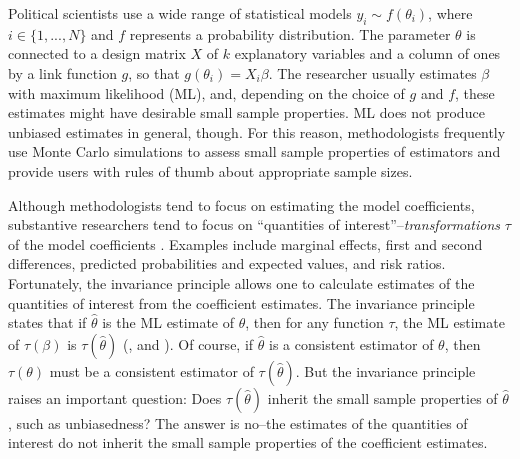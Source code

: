 \documentclass[12pt]{article}
\begin{document}
Political scientists use a wide range of statistical models $y_i \sim f(\theta_i)$, where $i \in \{1,..., N\}$ and $f$ represents a probability distribution. 
The parameter $\theta$ is connected to a design matrix $X$ of $k$ explanatory variables and a column of ones by a link function $g$, so that $g(\theta_i) = X_i\beta$. 
The researcher usually estimates $\beta$ with maximum likelihood (ML), and, depending on the choice of $g$ and $f$, these estimates might have desirable small sample properties. 
ML does not produce unbiased estimates in general, though. 
For this reason, methodologists frequently use Monte Carlo simulations to assess small sample properties of estimators and provide users with rules of thumb about appropriate sample sizes.

Although methodologists tend to focus on estimating the model coefficients, substantive researchers tend to focus on ``quantities of interest''--\textit{transformations} $\tau$ of the model coefficients \citep{KingTomzWittenberg2000}. 
Examples include marginal effects, first and second differences, predicted probabilities and expected values, and risk ratios. 
Fortunately, the invariance principle allows one to calculate estimates of the quantities of interest from the coefficient estimates.
The invariance principle states that if $\hat{\theta}$ is the ML estimate of $\theta$, then for any function $\tau$, the ML estimate of $\tau(\beta)$ is $\tau(\hat{\theta})$ (\citealt[pp. 75-76]{King1989}, and \citealt[pp. 320-321]{CasellaBerger2002}). %
Of course, if $\hat{\theta}$ is a consistent estimator of $\theta$, then $\tau(\theta)$ must be a consistent estimator of $\tau(\hat{\theta})$. 
But the invariance principle raises an important question: Does $\tau(\hat{\theta})$ inherit the small sample properties of $\hat{\theta}$, such as unbiasedness?
The answer is no--the estimates of the quantities of interest do not inherit the small sample properties of the coefficient estimates. 
\end{document}

